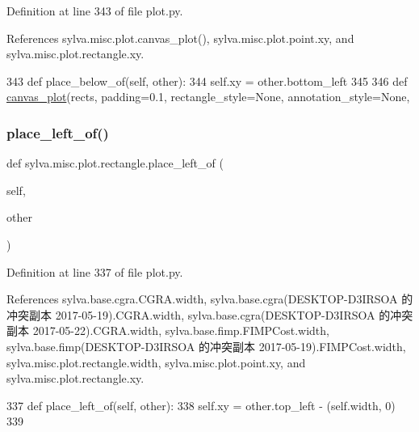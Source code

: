Definition at line 343 of file plot.\+py.



References sylva.\+misc.\+plot.\+canvas\+\_\+plot(), sylva.\+misc.\+plot.\+point.\+xy, and sylva.\+misc.\+plot.\+rectangle.\+xy.


\begin{DoxyCode}
343         \textcolor{keyword}{def }place\_below\_of(self, other):
344             self.xy = other.bottom\_left
345 
346     \textcolor{keyword}{def }\hyperlink{namespacesylva_1_1misc_1_1plot_a405ea3f626f2fbeea085e412f742ce68}{canvas\_plot}(rects, padding=0.1, rectangle\_style=None, annotation\_style=None,
\end{DoxyCode}
\mbox{\label{classsylva_1_1misc_1_1plot_1_1rectangle_ad468b38c9b5c95f14e5a6dec5d064cb1}} 
\subsubsection{\texorpdfstring{place\+\_\+left\+\_\+of()}{place\_left\_of()}}
{\footnotesize\ttfamily def sylva.\+misc.\+plot.\+rectangle.\+place\+\_\+left\+\_\+of (\begin{DoxyParamCaption}\item[{}]{self,  }\item[{}]{other }\end{DoxyParamCaption})}



Definition at line 337 of file plot.\+py.



References sylva.\+base.\+cgra.\+C\+G\+R\+A.\+width, sylva.\+base.\+cgra(\+D\+E\+S\+K\+T\+O\+P-\/\+D3\+I\+R\+S\+O\+A 的冲突副本 2017-\/05-\/19).\+C\+G\+R\+A.\+width, sylva.\+base.\+cgra(\+D\+E\+S\+K\+T\+O\+P-\/\+D3\+I\+R\+S\+O\+A 的冲突副本 2017-\/05-\/22).\+C\+G\+R\+A.\+width, sylva.\+base.\+fimp.\+F\+I\+M\+P\+Cost.\+width, sylva.\+base.\+fimp(\+D\+E\+S\+K\+T\+O\+P-\/\+D3\+I\+R\+S\+O\+A 的冲突副本 2017-\/05-\/19).\+F\+I\+M\+P\+Cost.\+width, sylva.\+misc.\+plot.\+rectangle.\+width, sylva.\+misc.\+plot.\+point.\+xy, and sylva.\+misc.\+plot.\+rectangle.\+xy.


\begin{DoxyCode}
337         \textcolor{keyword}{def }place\_left\_of(self, other):
338             self.xy = other.top\_left - (self.width, 0)
339 
\end{DoxyCode}
\mbox{\label{classsylva_1_1misc_1_1plot_1_1rectangle_a614690234b91159164255ffc1a32f8be}} 
